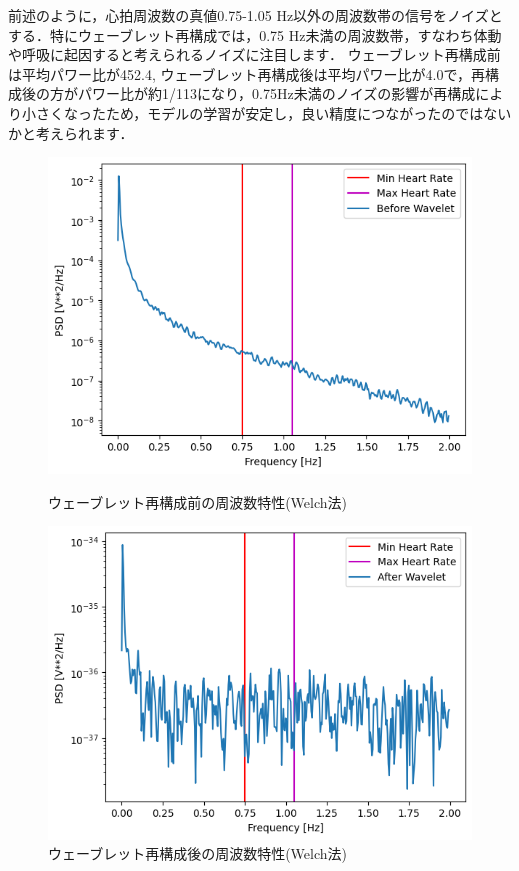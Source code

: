 \documentclass[dvipdfmx]{jsarticle}
\begin{document}
前述のように，心拍周波数の真値0.75-1.05 Hz以外の周波数帯の信号をノイズとする．特にウェーブレット再構成では，0.75 Hz未満の周波数帯，すなわち体動や呼吸に起因すると考えられるノイズに注目します．
ウェーブレット再構成前は平均パワー比が452.4, ウェーブレット再構成後は平均パワー比が4.0で，再構成後の方がパワー比が約1/113になり，0.75Hz未満のノイズの影響が再構成により小さくなったため，モデルの学習が安定し，良い精度につながったのではないかと考えられます．

\begin{figure}[htbp]
    \begin{minipage}[c]{0.5\hsize}
      \centering
      \includegraphics[width=\linewidth]{./fig/before_wavelet_freq.png}
      \caption{ウェーブレット再構成前の周波数特性(Welch法)}
    \end{minipage}
    \begin{minipage}[c]{0.5\hsize}
      \centering
      \includegraphics[width=\linewidth]{./fig/after_wavelet_freq.png}
      \caption{ウェーブレット再構成後の周波数特性(Welch法)}
    \end{minipage}
\end{figure}
\end{document}
